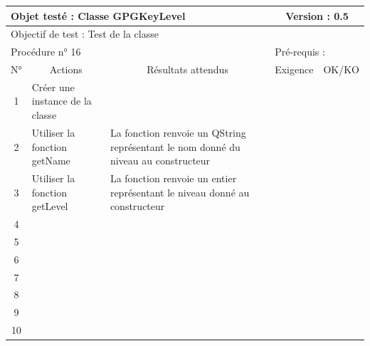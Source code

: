\documentclass{../res/univ-projet}
\begin{document}
\begin{center}
    \begin{tabular}{|c|p{5cm}|p{5cm}|p{1.5cm}|p{1.5cm}|}
      \hline
      \multicolumn{3}{|l|}{Objet testé : Classe GPGKeyLevel} & \multicolumn{2}{c|}{Version : 0.5}\\ \hline
      \multicolumn{5}{|l|}{Objectif de test : Test de la classe}\\ \hline
      \multicolumn{3}{|l|}{Procédure n° 16} & \multicolumn{2}{p{3cm}|}{Pré-requis : }\\ \hline
      \multicolumn{1}{|c|}{N°} & \multicolumn{1}{c|}{Actions} & \multicolumn{1}{c|}{Résultats attendus} & 
      \multicolumn{1}{c|}{Exigence} & \multicolumn{1}{c|}{OK/KO}\\ \hline
      1 & Créer une instance de la classe &  &  & \\
      2 & Utiliser la fonction getName & La fonction renvoie un QString représentant le nom donné du niveau au constructeur &  & \\
      3 & Utiliser la fonction getLevel & La fonction renvoie un entier représentant le niveau donné au constructeur &  & \\
      4 &  &  &  & \\
      5 &  &  &  & \\
	  6 &  &  &  & \\
      7 &  &  &  & \\
      8 &  &  &  & \\
      9 &  &  &  & \\
      10 &  &  &  &\\ 
	\hline
    \end{tabular}
    \vskip 2.2cm
	

\end{center}
\end{document}
